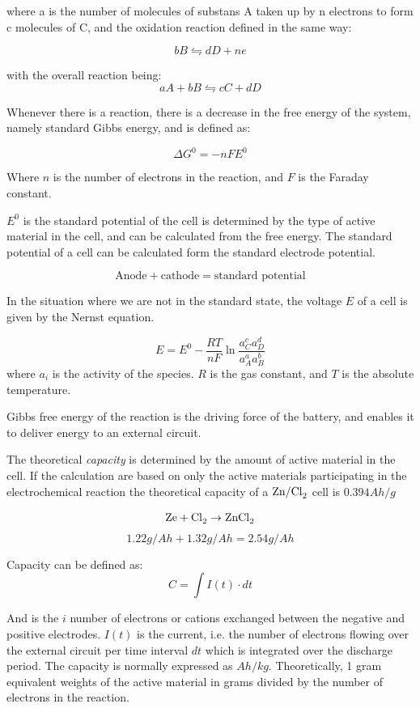 	where a is the number of molecules of substans A taken up by n electrons to form c molecules of C, and the oxidation reaction defined in the same way:
	
	$$bB \leftrightharpoons dD + ne $$ 
	
	with the overall reaction being: 
	\begin{equation}
	aA + bB \leftrightharpoons cC+ dD
	\label{eq:redox}
	\end{equation}
	
	Whenever there is a reaction, there is a decrease in the free energy of the system, namely standard Gibbs energy, and is defined as:  
	
	$$\Delta G^0 = -nFE^0$$
	
	Where $n$ is the number of electrons in the reaction, and $F$ is the Faraday constant. 
	
	$E^0$ is the standard potential of the cell is determined by the type of active material in the cell, and can be calculated from the free energy. The standard potential of a cell can be calculated form the standard electrode potential.
	
	$$\text{Anode} + \text{cathode} = \text{standard potential}$$ 
	
	
	In the situation where we are not in the standard state, the voltage $E$ of a cell is given by the Nernst equation.
	
	$$ E = E^0 -\frac{RT}{nF} \ln{\frac{a^c_C a^d_D} {a^a_A a^b_B} } $$ 
	where $a_i$ is the activity of the species. $R$ is the gas constant, and $T$ is the absolute temperature. 
	
	Gibbs free energy of the reaction is the driving force of the battery, and enables it to deliver energy to an external circuit. 
	
	
	The theoretical \textit{capacity} is determined by the amount of active material in the cell. If the calculation are based on only the  active materials participating in the electrochemical reaction the theoretical capacity of a $\ce{Zn/Cl_2}$ cell is $0.394 \si{Ah/g}$
	
	$$\ce{Ze} + \ce{Cl_2} \rightarrow \ce{ZnCl_2}$$
	$$1.22 \si{g/Ah} + 1.32 \si{g/Ah} = 2.54 \si{g/Ah}$$
	
	Capacity can be defined as:
	\begin{equation}
	C = \int I(t)\cdot dt
	\end{equation}
	
	And is the $i$ number of electrons or cations exchanged between the negative and positive electrodes. $I(t)$ is the current, i.e. the number of electrons flowing over the external circuit per time interval $dt$ which is integrated over the discharge period. The capacity is normally expressed as $\si{Ah/kg}$. Theoretically, 1 gram equivalent weights of the active material in grams divided by the number of electrons in the reaction.
		

